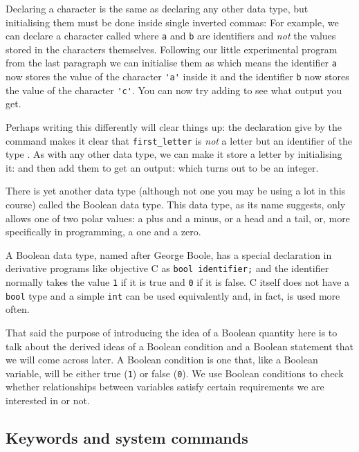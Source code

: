 \documentclass[11pt,oneside]{article}
\begin{document}
{{{{{{{Declaring a character is the same as declaring any other data type, but initialising them must be done inside single inverted commas:  For example, we can declare a character called  where \verb+a+ and \verb+b+ are identifiers and \textit{not} the values stored in the characters themselves. Following our little experimental program from the last paragraph we can initialise them as  which means the identifier \verb+a+ now stores the value of the character \verb+'a'+ inside it and the identifier \verb+b+ now stores the value of the character \verb+'c'+. You can now try adding  to see what output you get.

Perhaps writing this differently will clear things up: the declaration give by the command  makes it clear that \verb+first_letter+ is \textit{not} a letter but an identifier of the type . As with any other data type, we can make it store a letter by initialising it:  and then add them to get an output:  which turns out to be an integer.

There is yet another data type (although not one you may be using a lot in this course) called the Boolean data type. This data type, as its name suggests, only allows one of two polar values: a plus and a minus, or a head and a tail, or, more specifically in programming, a one and a zero.

A Boolean data type, named after George Boole, has a special declaration in derivative programs like objective C as \verb+bool identifier;+ and the identifier normally takes the value \verb+1+ if it is true and \verb+0+ if it is false. C itself does not have a \verb+bool+ type and a simple \verb+int+ can be used equivalently and, in fact, is used more often.

That said the purpose of introducing the idea of a Boolean quantity here is to talk about the derived ideas of a Boolean condition and a Boolean statement that we will come across later. A Boolean condition is one that, like a Boolean variable, will be either true (\verb+1+) or false (\verb+0+). We use Boolean conditions to check whether relationships between variables satisfy certain requirements we are interested in or not.

\subsection{Keywords and system commands}

}}}}}}}
\end{document}
